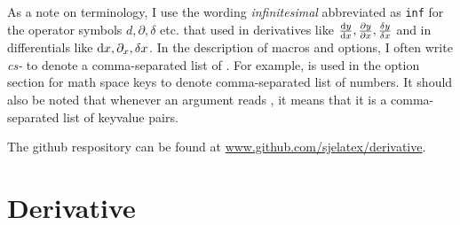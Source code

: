 	As a note on terminology, I use the wording \emph{infinitesimal} abbreviated as \texttt{inf} for the operator symbols $d, \partial, \delta$ etc. that used in derivatives like $\odv{y}{x}, \pdv{y}{x}, \fdv{y}{x}$ and in differentials like $\odif{x}, \pdif{x}, \fdif{x}$. In the description of macros and options, I often write \emph{cs-} to denote a comma-separated list of . For example,  is used in the option section for math space keys to denote comma-separated list of numbers. It should also be noted that whenever an argument reads , it means that it is a comma-separated list of keyvalue pairs.
	
	\bigskip
	
	\noindent The github respository can be found at \href{https://github.com/sjelatex/derivative}{www.github.com/sjelatex/derivative}.
	
	
	
	\clearpage
	\section{Derivative}
	
